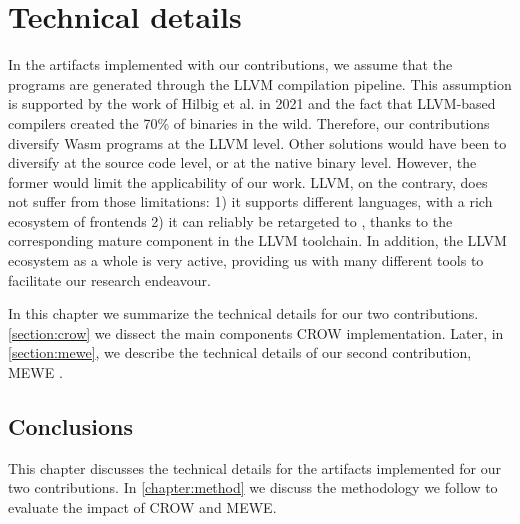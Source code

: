 \chapter{Technical details}
\label{chapter:technical}

In the artifacts implemented with our contributions, we assume that the \wasm programs are generated through the LLVM compilation pipeline. This assumption is supported by the work of Hilbig et al. \cite{Hilbig2021AnES} in 2021 and the fact that LLVM-based compilers created the 70\% of \wasm binaries in the wild. Therefore,
our contributions diversify Wasm programs at the LLVM level. Other solutions would have been to diversify at the source code level, or at the native binary level. However, the former would limit the applicability of our work. 
LLVM, on the contrary, does not suffer from those limitations: 1) it supports different languages, with a rich ecosystem of frontends 2) it can reliably be retargeted to \wasm, thanks to the corresponding mature component in the LLVM toolchain. In addition, the LLVM ecosystem as a whole is very active, providing us with many different tools to facilitate our research endeavour.

In this chapter we summarize the technical details for our two contributions. \autoref{section:crow} we dissect the main components CROW \cite{CROW} implementation. Later, in \autoref{section:mewe}, we describe the technical details of our second contribution, MEWE \cite{MEWE}.








\section*{Conclusions}

This chapter discusses the technical details for the artifacts implemented for our two contributions.
In \autoref{chapter:method} we discuss the methodology we follow to evaluate the impact of CROW and MEWE.